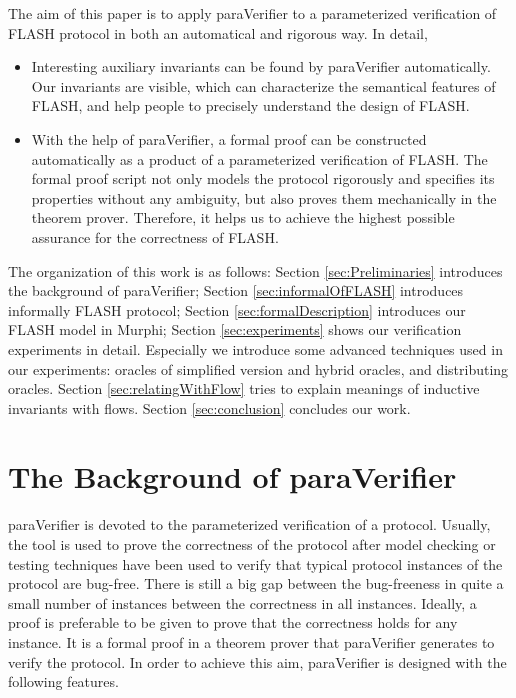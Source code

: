\documentclass{llncs}
\begin{document}
The aim of this paper is to apply {\sf paraVerifier}\cite{liatva2015} to a  parameterized verification of FLASH protocol in both an automatical and rigorous way. In detail,
\begin{itemize}
\item Interesting auxiliary invariants can be found by {\sf paraVerifier} automatically. Our invariants are visible, which can characterize the semantical features of FLASH, and help people to precisely understand the design of   FLASH.

\item With the help of {\sf paraVerifier}, a formal proof can be constructed automatically as a product of a parameterized verification of FLASH. The formal proof script not  only models the protocol rigorously and specifies its properties without any ambiguity, but also proves them mechanically in the theorem prover. Therefore, it helps us to achieve the highest possible assurance for the correctness of FLASH.


\end{itemize}

The organization of this work is as follows: Section \ref{sec:Preliminaries} introduces the background of {\sf paraVerifier}; Section  \ref{sec:informalOfFLASH} introduces informally FLASH protocol; Section \ref{sec:formalDescription} introduces our FLASH model in Murphi\cite{Dill1996}; Section \ref{sec:experiments} shows our verification experiments in detail. Especially we introduce some advanced techniques used in our experiments: oracles of simplified version and hybrid oracles, and distributing oracles. Section \ref{sec:relatingWithFlow} tries to explain meanings of inductive invariants with flows.  Section \ref{sec:conclusion} concludes our work.

\section{The Background  of {\sf paraVerifier}\label{sec:Preliminaries}}
{\sf paraVerifier} is devoted to the parameterized verification of a protocol. Usually, the tool is used to prove the correctness of the protocol after model checking or testing techniques have been used to verify that typical protocol instances of the protocol  are bug-free. There is still a big gap between the bug-freeness in quite a small number of instances between the correctness in all instances.  Ideally, a proof is preferable to be given to  prove that the correctness holds for any instance. It is a formal proof in a theorem prover that {\sf paraVerifier} generates to verify the protocol. In order to achieve this aim, {\sf paraVerifier} is designed with the following features.
\end{document}

